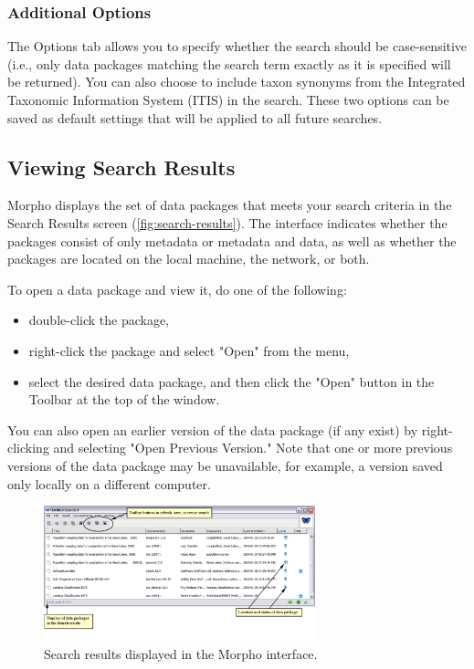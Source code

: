 \subsubsection[Options]{Additional Options} \label{sec:search-options}

The Options tab allows you to specify whether the search should be
case-sensitive (i.e., only data packages matching the search term
exactly as it is specified will be returned). You can also choose to
include taxon synonyms from the Integrated Taxonomic Information System
(ITIS) in the search.  These two options can be saved as default
settings that will be applied to all future searches.

\subsection{Viewing Search Results}

Morpho displays the set of data packages that meets your search criteria
in the Search Results screen (\autoref{fig:search-results}). The
interface indicates whether the packages consist of only metadata or
metadata and data, as well as whether the packages are located on the
local machine, the network, or both.

To open a data package and view it, do one of the following:
\begin{itemize}
  \setlength{\parskip}{1pt}
    \item double-click the package,
    \item right-click the package and select "Open" from the menu,
    \item select the desired data package, and then click the "Open"
      button in the Toolbar at the top of the window.
\end{itemize}

You can also open an earlier version of the data package (if any exist)
by right-clicking and selecting "Open Previous Version." Note that one
or more previous versions of the data package may be unavailable, for
example, a version saved only locally on a different computer.

\begin{figure}
  \centering
    \includegraphics[width=0.7\textwidth]{images/search-results.jpg}
  \caption{Search results displayed in the Morpho interface.}
  \label{fig:search-results}
\end{figure}

